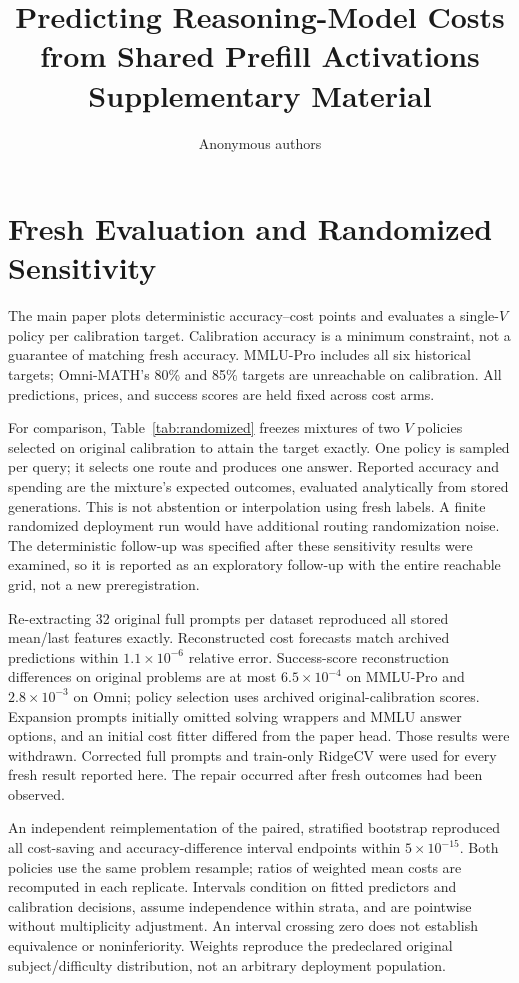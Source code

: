 \documentclass[10pt,twocolumn,letterpaper]{article}
\begin{document}
\title{Predicting Reasoning-Model Costs from Shared Prefill Activations\\Supplementary Material}
\author{Anonymous authors}
\maketitle

\section{Fresh Evaluation and Randomized Sensitivity}
The main paper plots deterministic accuracy--cost points and evaluates a single-$V$ policy per calibration target. Calibration accuracy is a minimum constraint, not a guarantee of matching fresh accuracy. MMLU-Pro includes all six historical targets; Omni-MATH's 80\% and 85\% targets are unreachable on calibration. All predictions, prices, and success scores are held fixed across cost arms.

For comparison, Table~\ref{tab:randomized} freezes mixtures of two $V$ policies selected on original calibration to attain the target exactly. One policy is sampled per query; it selects one route and produces one answer. Reported accuracy and spending are the mixture's expected outcomes, evaluated analytically from stored generations. This is not abstention or interpolation using fresh labels. A finite randomized deployment run would have additional routing randomization noise. The deterministic follow-up was specified after these sensitivity results were examined, so it is reported as an exploratory follow-up with the entire reachable grid, not a new preregistration.



Re-extracting 32 original full prompts per dataset reproduced all stored mean/last features exactly. Reconstructed cost forecasts match archived predictions within $1.1\times10^{-6}$ relative error. Success-score reconstruction differences on original problems are at most $6.5\times10^{-4}$ on MMLU-Pro and $2.8\times10^{-3}$ on Omni; policy selection uses archived original-calibration scores. Expansion prompts initially omitted solving wrappers and MMLU answer options, and an initial cost fitter differed from the paper head. Those results were withdrawn. Corrected full prompts and train-only RidgeCV were used for every fresh result reported here. The repair occurred after fresh outcomes had been observed.

An independent reimplementation of the paired, stratified bootstrap reproduced all cost-saving and accuracy-difference interval endpoints within $5\times10^{-15}$. Both policies use the same problem resample; ratios of weighted mean costs are recomputed in each replicate. Intervals condition on fitted predictors and calibration decisions, assume independence within strata, and are pointwise without multiplicity adjustment. An interval crossing zero does not establish equivalence or noninferiority. Weights reproduce the predeclared original subject/difficulty distribution, not an arbitrary deployment population.
\end{document}
